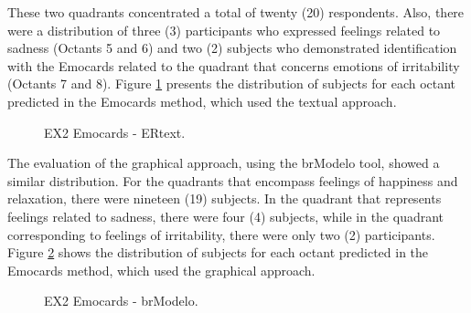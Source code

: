 These two quadrants concentrated a total of twenty (20) respondents.
Also, there were a distribution of three (3) participants who expressed feelings related to sadness (Octants 5 and 6) and two (2) subjects who demonstrated identification with the Emocards related to the quadrant that concerns emotions of irritability (Octants 7 and 8).
Figure \ref{fig:Emocards1_alt} presents the distribution of subjects for each octant predicted in the Emocards method, which used the textual approach.

\begin{figure}[!htb]
    \centering
    \caption{EX2 Emocards - ERtext.}
    \label{fig:Emocards1_alt}
    
\end{figure}

The evaluation of the graphical approach, using the brModelo tool, showed a similar distribution.
For the quadrants that encompass feelings of happiness and relaxation, there were nineteen (19) subjects.
In the quadrant that represents feelings related to sadness, there were four (4) subjects, while in the quadrant corresponding to feelings of irritability, there were only two (2) participants.
Figure \ref{fig:Emocards2_alt} shows the distribution of subjects for each octant predicted in the Emocards method, which used the graphical approach.

\begin{figure}[!htb]
    \centering
    \caption{EX2 Emocards - brModelo.}
    \label{fig:Emocards2_alt}
    
\end{figure}

